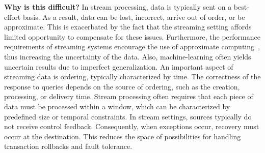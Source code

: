 
\textbf{Why is this difficult?}
%
In stream processing, data is typically sent on a best-effort basis.
As a result, data can be lost, incorrect, arrive out of order, or be
approximate. This is exacerbated by the fact that the streaming
setting affords limited opportunity to compensate for these issues.
Furthermore, the performance requirements of streaming systems
encourage the use of approximate computing~\cite{babcock_et_al_2002},
thus increasing the uncertainty of the data. Also, machine-learning
often yields uncertain results due to imperfect generalization.
An important aspect of streaming data is ordering, typically
characterized by time.  The correctness of the response to
queries depends on the source of ordering, such as the creation,
processing, or delivery time.  Stream processing often requires that
each piece of data must be processed within a window, which can be
characterized by predefined size or temporal constraints. In stream
settings, sources typically do not receive control feedback.
Consequently, when exceptions occur, recovery must occur at the
destination. This reduces the space of possibilities for handling
transaction rollbacks and fault tolerance.

